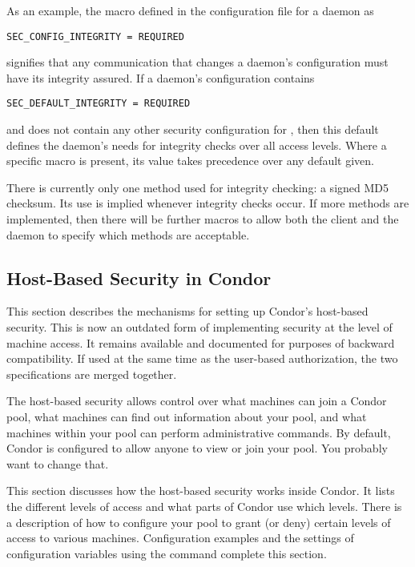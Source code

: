 As an example, the macro defined in the configuration file
for a daemon as
\begin{verbatim}
SEC_CONFIG_INTEGRITY = REQUIRED
\end{verbatim}
signifies that any communication that changes a daemon's configuration
must have its integrity assured.
If a daemon's configuration contains
\begin{verbatim}
SEC_DEFAULT_INTEGRITY = REQUIRED
\end{verbatim}
and does not contain any other security configuration for
\verb@INTEGRITY@, then this default defines the daemon's needs
for integrity checks over all access levels.
Where a specific macro is present, its value takes
precedence over any default given.

There is currently only one method used for integrity checking:
a signed MD5 checksum.
Its use is implied whenever integrity checks occur.
If more methods are implemented, then there will be further
macros to allow both the client and the daemon to specify
which methods are acceptable.


\subsection{\label{sec:Host-Security}Host-Based Security in
Condor} 

This section describes the mechanisms for setting up Condor's
host-based security.  
This is now an outdated form of implementing security at
the level of machine access. 
It remains available and documented for purposes of backward compatibility.
If used at the same time as the user-based authorization,
the two specifications are merged together.

The host-based security allows control over what machines can
join a Condor pool, what machines can find out information about
your pool, and what machines within your pool can perform
administrative commands.  By default, Condor is configured to allow
anyone to view or join your pool.  You probably want to change that.

This section discusses how the host-based security works inside Condor.
It lists the different levels of access and what
parts of Condor use which levels.
There is a description of how to configure
your pool to grant (or deny) certain levels of access to various
machines.
Configuration examples and the settings of configuration variables
using the  command complete this section.

